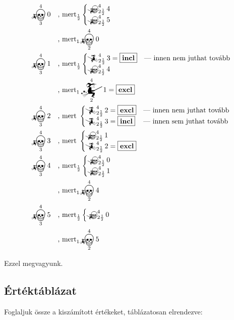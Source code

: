 \documentclass{article}
\newcommand{\just}[1]{\boxed{#1}}%
\newcommand{\incl}{\mathbf{incl}}
\newcommand{\excl}{\mathbf{excl}}
\newcommand{\mainfunA}[3]{\mathwitch_{#2}^{#1}#3}
\newcommand{\mainfunB}[3]{\reversemathwitch_{#2}^{#1}#3}
\newcommand{\nomainfunA}[3]{{}_{\mathwitch}\!\!\!\!\bigskull^{#1}_{#2}#3}
\newcommand{\nomainfunB}[3]{{}_{\reversemathwitch}\!\!\!\!\bigskull^{#1}_{#2}#3}
\begin{document}
	\begin{align*}
		&\nomainfunA430   &&\text{, mert}_\frac12\begin{cases}\nomainfunB4{2\frac12}4\\\nomainfunB4{2\frac12}5\end{cases}\\
		&                &&\text{, mert}_1\nomainfunA420\\
		&\nomainfunA431   &&\text{, mert}_\frac12\begin{cases}\mainfunB4{2\frac12}3 = \just\incl&\text{--- innen nem juthat tovább}\\\nomainfunB4{2\frac12}4\end{cases}\\
		&                &&\text{, mert}_1\mainfunA421 = \just\excl\\
		&\nomainfunA432   &&\text{, mert }\begin{cases}\mainfunB4{2\frac12}2 = \just\excl&\text{--- innen nem juthat tovább}\\\mainfunB4{2\frac12}3 = \just\incl&\text{--- innen sem juthat tovább}\end{cases}\\
		&\nomainfunA433   &&\text{, mert }\begin{cases}\nomainfunB4{2\frac12}1\\\mainfunB4{2\frac12}2 = \just\excl&\end{cases}\\
		&\nomainfunA434   &&\text{, mert}_\frac12\begin{cases}\nomainfunB4{2\frac12}0\\\nomainfunB4{2\frac12}1\end{cases}\\
		&                &&\text{, mert}_1\nomainfunA424\\
		&\nomainfunA435   &&\text{, mert}_\frac12\begin{cases}\nomainfunB4{2\frac12}0\end{cases}\\
		&                &&\text{, mert}_1\nomainfunA425
	\end{align*}

	Ezzel megvagyunk.

	\subsection{Értéktáblázat}

	Foglaljuk össze a kiszámított értékeket, táblázatosan elrendezve:
\end{document}
